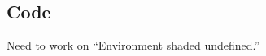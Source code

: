 \clearpage



\begin{appendix}
\clearpage
\appendix

\hypertarget{code}{%
\section{\texorpdfstring{Code \label{app:code}}{Code }}\label{code}}

Need to work on ``Environment shaded undefined.''
\end{appendix}
